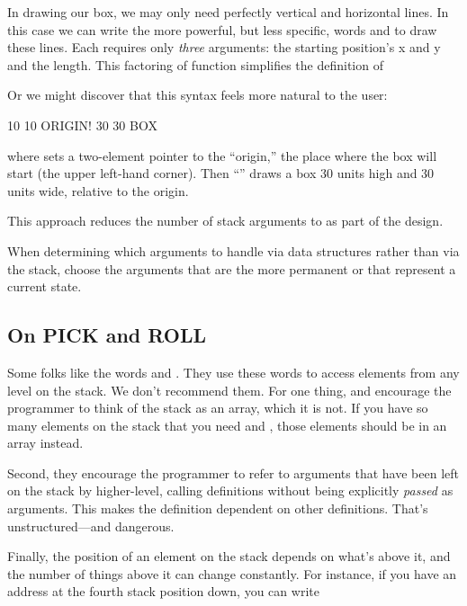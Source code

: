 In drawing our box, we may only need perfectly vertical and horizontal
lines. In this case we can write the more powerful, but less specific,
words  and  to draw these lines. Each requires
only \emph{three} arguments: the starting position's x and y and the
length. This factoring of function simplifies the definition of

Or we might discover that this syntax feels more natural to the
user:

\begin{Code}
10 10 ORIGIN! 30 30 BOX
\end{Code}
where  sets a two-element pointer to the ``origin,'' the place
where the box will start (the upper left-hand corner). Then ``''
draws a box 30 units high and 30 units wide, relative to the origin.

This approach reduces the number of stack arguments to  as
part of the design.

\begin{tip}
When determining which arguments to handle via data structures rather
than via the stack, choose the arguments that are the more permanent or
that represent a current state.
\end{tip}

\subsection{On PICK and ROLL}

Some folks like the words  and . They use these words to
access elements from any level on the stack. We don't recommend them.
For one thing,  and  encourage the programmer to think
of the stack as an array, which it is not. If you have so many elements on
the stack that you need  and , those elements should be in
an array instead.

Second, they encourage the programmer to refer to arguments that
have been left on the stack by higher-level, calling definitions without
being explicitly \emph{passed} as arguments. This makes the definition
dependent on other definitions. That's unstructured---and dangerous.

Finally, the position of an element on the stack depends on what's
above it, and the number of things above it can change constantly. For
instance, if you have an address at the fourth stack position down, you can
write

